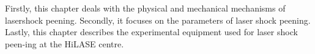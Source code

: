 \label{chap:testing}

Firstly, this chapter deals with the physical and mechanical mechanisms of lasershock peening. Secondly, it focuses on the parameters of laser shock peening. Lastly, this chapter describes the experimental equipment used for laser shock peen-ing at the HiLASE centre.